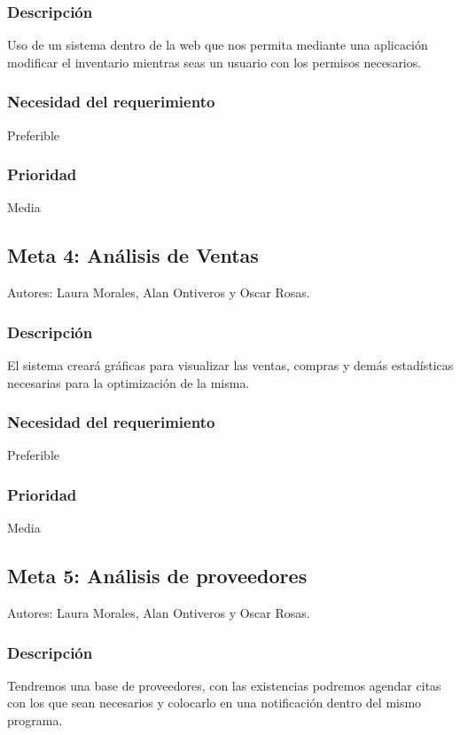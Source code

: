 \documentclass[12pt, fleqn]{report}                             %
\theoremstyle{break}                                            %
\begin{document}
   \subsubsection{Descripción}
   Uso de un sistema dentro de la web que nos permita mediante una aplicación modificar el inventario mientras seas un usuario con los permisos necesarios.
   
    \subsubsection{Necesidad del requerimiento}
    Preferible
    \subsubsection{Prioridad}
    Media
    
    
    \subsection{Meta 4: Análisis de Ventas}
    Autores: Laura Morales, Alan Ontiveros y Oscar Rosas.
    
   \subsubsection{Descripción}
   El sistema creará gráficas para visualizar las ventas, compras y demás estadísticas necesarias para la optimización de la misma.
    \subsubsection{Necesidad del requerimiento}
    Preferible
    \subsubsection{Prioridad}
    Media
    
    
    \subsection{Meta 5: Análisis de proveedores}
    Autores: Laura Morales, Alan Ontiveros y Oscar Rosas.
    
   \subsubsection{Descripción}
   Tendremos una base de proveedores, con las existencias podremos agendar citas con los que sean necesarios y colocarlo en una notificación dentro del mismo programa.
\end{document}
